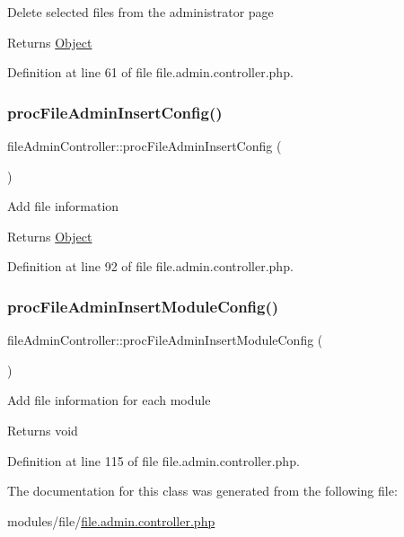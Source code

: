 Delete selected files from the administrator page

\begin{DoxyReturn}{Returns}
\hyperlink{classObject}{Object} 
\end{DoxyReturn}


Definition at line 61 of file file.\+admin.\+controller.\+php.

\hypertarget{classfileAdminController_a03889846de03ed7142320ef12aed5eda}{}\label{classfileAdminController_a03889846de03ed7142320ef12aed5eda} 
\subsubsection{\texorpdfstring{proc\+File\+Admin\+Insert\+Config()}{procFileAdminInsertConfig()}}
{\footnotesize\ttfamily file\+Admin\+Controller\+::proc\+File\+Admin\+Insert\+Config (\begin{DoxyParamCaption}{ }\end{DoxyParamCaption})}

Add file information

\begin{DoxyReturn}{Returns}
\hyperlink{classObject}{Object} 
\end{DoxyReturn}


Definition at line 92 of file file.\+admin.\+controller.\+php.

\hypertarget{classfileAdminController_af0fc824e9379d6c2fdd55c7b7444c317}{}\label{classfileAdminController_af0fc824e9379d6c2fdd55c7b7444c317} 
\subsubsection{\texorpdfstring{proc\+File\+Admin\+Insert\+Module\+Config()}{procFileAdminInsertModuleConfig()}}
{\footnotesize\ttfamily file\+Admin\+Controller\+::proc\+File\+Admin\+Insert\+Module\+Config (\begin{DoxyParamCaption}{ }\end{DoxyParamCaption})}

Add file information for each module

\begin{DoxyReturn}{Returns}
void 
\end{DoxyReturn}


Definition at line 115 of file file.\+admin.\+controller.\+php.



The documentation for this class was generated from the following file\+:\begin{DoxyCompactItemize}
\item 
modules/file/\hyperlink{file_8admin_8controller_8php}{file.\+admin.\+controller.\+php}\end{DoxyCompactItemize}
